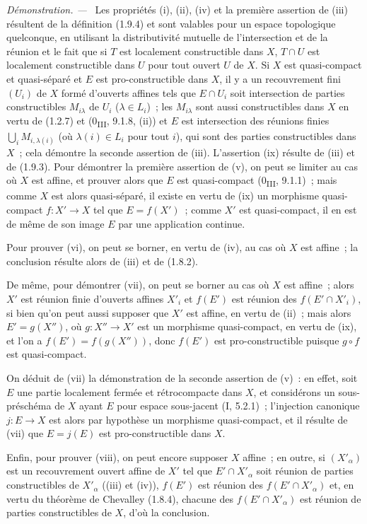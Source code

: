 \documentclass[10pt,oneside]{book}
\newcommand{\oldpage}[2][]{%
  \setcounter{footnote}{0}%
  \marginpar{\scriptsize\textbf{#1}~|~#2}\ignorespaces}
\newenvironment{proof}{%
  \par\medskip\noindent\textit{Démonstration. ---\ }}{\par}
\begin{document}
\begin{proof}
Les propriétés (i), (ii), (iv) et la première assertion de (iii) résultent
de la définition (1.9.4) et sont valables pour un espace topologique
quelconque, en utilisant la distributivité mutuelle de l'intersection et de
la réunion et le fait que si $T$ est localement constructible dans $X$,
$T\cap U$ est localement constructible dans $U$ pour tout ouvert $U$ de $X$.
Si $X$ est quasi-compact et quasi-séparé et $E$ est pro-constructible dans
$X$, il y a un recouvrement fini $(U_i)$ de $X$ formé d'ouverts affines tels
que $E\cap U_i$ soit intersection de parties constructibles $M_{i\lambda}$
de $U_i$ ($\lambda\in L_i$)~; les $M_{i\lambda}$ sont aussi constructibles
dans $X$ en vertu de (1.2.7) et (0\textsubscript{III}, 9.1.8, (ii)) et $E$ est
intersection des réunions finies $\bigcup_iM_{i,\lambda(i)}$ (où
$\lambda(i)\in L_i$ pour tout $i$), qui sont des parties constructibles dans
$X$~; cela démontre la seconde assertion de (iii). L'assertion (ix) résulte
de (iii) et de (1.9.3). Pour démontrer la première assertion de (v), on peut
se limiter au cas où $X$ est affine, et prouver alors que $E$ est
quasi-compact (0\textsubscript{III}, 9.1.1)~; mais comme $X$ est alors
quasi-séparé, il existe en vertu de (ix) un morphisme quasi-compact
$f:X'\to X$ tel que $E=f(X')$~; comme $X'$ est quasi-compact, il en est de
même de son image $E$ par une application continue.

Pour prouver (vi), on peut se borner, en vertu de (iv), au cas où $X$ est
affine~; la conclusion résulte alors de (iii) et de (1.8.2).

\oldpage[IV-1]{245}

De même, pour démontrer (vii), on peut se borner au cas où $X$ est affine~;
alors $X'$ est réunion finie d'ouverts affines $X'_i$ et $f(E')$ est réunion
des $f(E'\cap X'_i)$, si bien qu'on peut aussi supposer que $X'$ est affine,
en vertu de (ii)~; mais alors $E'=g(X'')$, où $g:X''\to X'$ est un morphisme
quasi-compact, en vertu de (ix), et l'on a $f(E')=f(g(X''))$, donc $f(E')$ est
pro-constructible puisque $g\circ f$ est quasi-compact.

On déduit de (vii) la démonstration de la seconde assertion de (v)~: en
effet, soit $E$ une partie localement fermée et rétrocompacte dans $X$, et
considérons un sous-préschéma de $X$ ayant $E$ pour espace sous-jacent (I,
5.2.1)~; l'injection canonique $j:E\to X$ est alors par hypothèse un
morphisme quasi-compact, et il résulte de (vii) que $E=j(E)$ est
pro-constructible dans $X$.

Enfin, pour prouver (viii), on peut encore supposer $X$ affine~; en outre, si
$(X'_\alpha)$ est un recouvrement ouvert affine de $X'$ tel que
$E'\cap X'_\alpha$ soit réunion de parties constructibles de $X'_\alpha$
((iii) et (iv)), $f(E')$ est réunion des $f(E'\cap X'_\alpha)$ et, en vertu
du théorème de Chevalley (1.8.4), chacune des $f(E'\cap X'_\alpha)$ est
réunion de parties constructibles de $X$, d'où la conclusion.
\end{proof}
\end{document}

